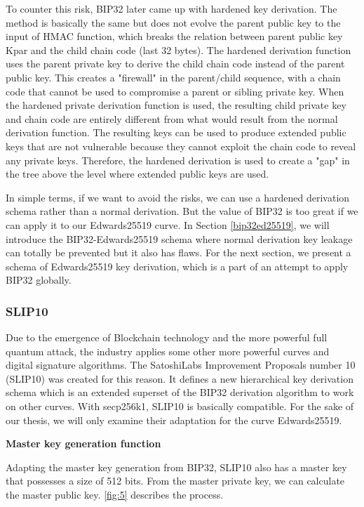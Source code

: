 \begin{adjustwidth}{1cm}{}
    To counter this risk, BIP32 later came up with hardened key derivation. The method is basically the same but does not evolve the parent public key to the input of HMAC function, which breaks the relation between parent public key Kpar and the child chain code (last 32 bytes). The hardened derivation function uses the parent private key to derive the child chain code instead of the parent public key. This creates a "firewall" in the parent/child sequence, with a chain code that cannot be used to compromise a parent or sibling private key. When the hardened private derivation function is used, the resulting child private key and chain code are entirely different from what would result from the normal derivation function. The resulting keys can be used to produce extended public keys that are not vulnerable because they cannot exploit the chain code to reveal any private keys. Therefore, the hardened derivation is used to create a "gap" in the tree above the level where extended public keys are used.

    In simple terms, if we want to avoid the risks, we can use a hardened derivation schema rather than a normal derivation. But the value of BIP32 is too great if we can apply it to our Edwards25519 curve. In Section \ref{bip32ed25519}, we will introduce the BIP32-Edwards25519 schema where normal derivation key leakage can totally be prevented but it also has flaws. For the next section, we present a schema of Edwards25519 key derivation, which is a part of an attempt to apply BIP32 globally.
\end{adjustwidth}

\subsubsection{SLIP10}
\label{SLIP10}

Due to the emergence of Blockchain technology and the more powerful full quantum attack, the industry applies some other more powerful curves and digital signature algorithms. The SatoshiLabs Improvement Proposals number 10 (SLIP10) was created for this reason. It defines a new hierarchical key derivation schema which is an extended superset of the BIP32 derivation algorithm to work on other curves. With secp256k1, SLIP10 is basically compatible. For the sake of our thesis, we will only examine their adaptation for the curve Edwards25519.

\bigskip
{\textbf{Master key generation function}}

Adapting the master key generation from BIP32, SLIP10 also has a master key that possesses a size of 512 bits. From the master private key, we can calculate the master public key.
\autoref{fig:5} describes the process.

